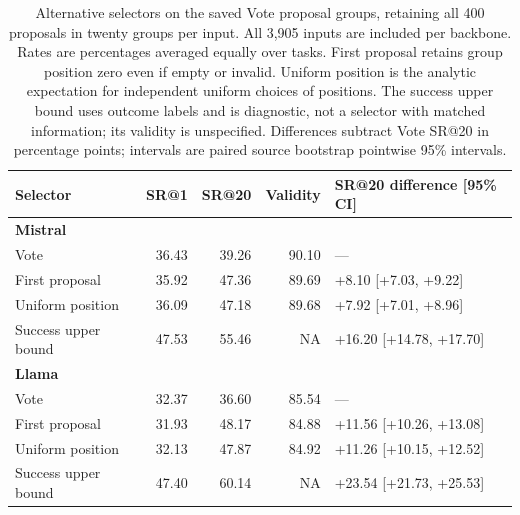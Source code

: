 \begin{table}[!htbp]
\centering
\setlength{\tabcolsep}{4pt}
\caption{Alternative selectors on the saved Vote proposal groups, retaining all 400 proposals in twenty groups per input. All 3,905 inputs are included per backbone. Rates are percentages averaged equally over tasks. First proposal retains group position zero even if empty or invalid. Uniform position is the analytic expectation for independent uniform choices of positions. The success upper bound uses outcome labels and is diagnostic, not a selector with matched information; its validity is unspecified. Differences subtract Vote SR@20 in percentage points; intervals are paired source bootstrap pointwise 95\% intervals.}
\label{tab:supp-vote-pool}
\begin{tabular}{lrrrl}
\toprule
Selector & SR@1 & SR@20 & Validity & SR@20 difference [95\% CI] \\
\midrule
\multicolumn{5}{l}{\textbf{Mistral}} \\
Vote & 36.43 & 39.26 & 90.10 & --- \\
First proposal & 35.92 & 47.36 & 89.69 & +8.10 [+7.03, +9.22] \\
Uniform position & 36.09 & 47.18 & 89.68 & +7.92 [+7.01, +8.96] \\
Success upper bound & 47.53 & 55.46 & NA & +16.20 [+14.78, +17.70] \\
\midrule
\multicolumn{5}{l}{\textbf{Llama}} \\
Vote & 32.37 & 36.60 & 85.54 & --- \\
First proposal & 31.93 & 48.17 & 84.88 & +11.56 [+10.26, +13.08] \\
Uniform position & 32.13 & 47.87 & 84.92 & +11.26 [+10.15, +12.52] \\
Success upper bound & 47.40 & 60.14 & NA & +23.54 [+21.73, +25.53] \\
\bottomrule
\end{tabular}
\end{table}
